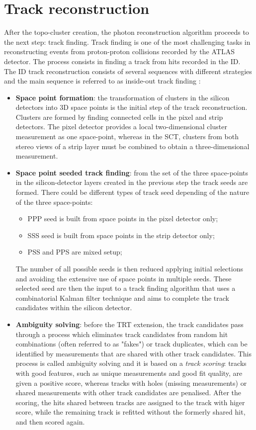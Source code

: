\documentclass[a4paper, oneside, 11pt, openright]{book}
\begin{document}
		\section{Track reconstruction}
			After the topo-cluster creation, the photon reconstruction algorithm proceeds to the next step: track finding. Track finding is one of the most challenging tasks in reconstructing events from proton-proton  collisions  recorded  by  the  ATLAS  detector. The process consists in finding a track from hits recorded in the ID. The ID track reconstruction consists of several sequences with different strategies and the main sequence is referred to as inside-out track finding \cite{ID_track1}: 
			\begin{itemize}
				\item \textbf{Space point formation}: the transformation of clusters in the silicon detectors into 3D space points is the initial step of the track reconstruction.  Clusters are formed by finding connected cells in the pixel and strip detectors. The pixel detector provides a local two-dimensional cluster measurement as one space-point, whereas in the SCT, clusters from both stereo views of a strip layer must be combined to obtain a three-dimensional measurement.

				\item \textbf{Space point seeded track finding}: from the set of the three space-points in the silicon-detector layers created in the previous step the track seeds are formed. There could be different types of track seed depending of the nature of the three space-points: 
				\begin{itemize}
					\item PPP seed is built from space points in the pixel detector only;
					\item SSS seed is built from space points in the strip detector only;
					\item PSS and PPS are mixed setup;
				\end{itemize}
				The number of all possible seeds is then reduced applying initial selections and avoiding the extensive use of space points in multiple seeds. These selected seed are then the input to a track finding algorithm that uses a combinatorial Kalman filter technique \cite{Kalman} and aims to complete the track candidates within the silicon detector.
				
				\item \textbf{Ambiguity solving}: before the TRT extension, the track candidates pass through a process which eliminates track candidates from random hit combinations (often referred to as "fakes") or track duplicates, which can be identified by measurements that are shared with other track candidates. This process is called ambiguity solving and it is based on a \textit{track scoring}: tracks with good features, such as unique measurements and good fit quality, are given a positive score, whereas tracks with holes (missing measurements) or shared measurements with other track candidates are penalised. After the scoring, the hits shared between tracks are assigned to the track with higer score, while the remaining track is refitted without the formerly shared hit, and then scored again.
				

\end{itemize}
\end{document}
